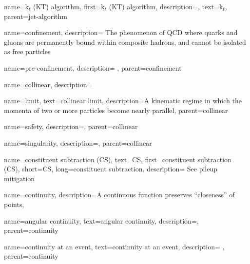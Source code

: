     {
        name=k\(_t\) (KT) algorithm,
        first={k\(_t\) (KT) algorithm},
        description={},
        text={k\(_t\)},
        parent=jet-algorithm
    }



{
    name=confinement,
    description={
        The phenomenon of QCD where quarks and gluons are permanently bound within composite hadrons, and cannot be isolated as free particles
    }
}

    {
        name=pre-confinement,
        description={
        },
        parent=confinement
    }




{
    name=collinear,
    description={}
}

    {
        name=limit,
        text=collinear limit,
        description={A kinematic regime in which the momenta of two or more particles become nearly parallel},
        parent=collinear
    }


    {
        name=safety,
        description={},
        parent=collinear
    }

    {
        name=singularity,
        description={},
        parent=collinear
    }



{
    name=constituent subtraction (CS),
    text=CS,
    first=constituent subtraction (CS),
    short=CS,
    long=constituent subtraction,
    description={
        See pileup mitigation
    }
}


{
  name=continuity,
  description={A continuous function preserves ``closeness'' of points},
}

    {
        name=angular continuity,
        text=angular continuity,
        description={},
        parent=continuity
    }


    {
        name=continuity at an event,
        text=continuity at an event,
        description={
        },
        parent=continuity
    }

